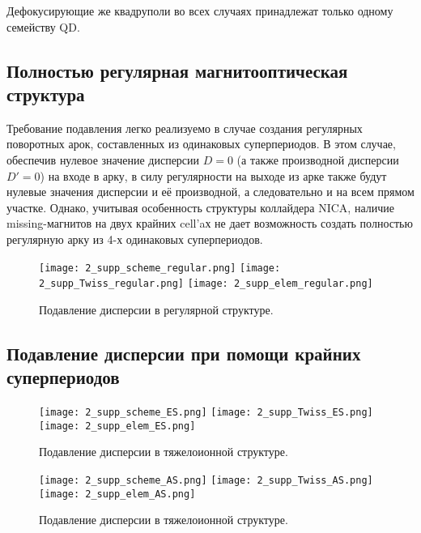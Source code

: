 \noindent Дефокусирующие же квадруполи во всех случаях принадлежат только одному семейству QD.	

\subsection{Полностью регулярная магнитооптическая структура}\label{subsec:transition_variation/disp_supperssion/regular}

\par Требование подавления легко реализуемо в случае создания регулярных поворотных арок, составленных из одинаковых суперпериодов. В этом случае, обеспечив нулевое значение дисперсии $D=0$ (а также производной дисперсии $D\prime=0$) на входе в арку, в силу регулярности на выходе из арке также будут нулевые значения дисперсии и её производной, а следовательно и на всем прямом участке. Однако, учитывая особенность структуры коллайдера NICA, наличие missing-магнитов на двух крайних cell’aх не дает возможность создать полностью регулярную арку из 4-х одинаковых суперпериодов.

\begin{figure} [h!]
   \center
   \texttt{[image: 2\_supp\_scheme\_regular.png]}
   \texttt{[image: 2\_supp\_Twiss\_regular.png]}
   \texttt{[image: 2\_supp\_elem\_regular.png]}
   \caption{Подавление дисперсии в регулярной структуре.}
   \label{fig:2_disp_supp_full_regular}
\end{figure}
	
\subsection{Подавление дисперсии при помощи крайних суперпериодов}\label{subsec:transition_variation/disp_supperssion/ES}

\par	
\begin{figure} [h!]
   \center
   \texttt{[image: 2\_supp\_scheme\_ES.png]}
   \texttt{[image: 2\_supp\_Twiss\_ES.png]}
   \texttt{[image: 2\_supp\_elem\_ES.png]}
   \caption{Подавление дисперсии в тяжелоионной структуре.}
   \label{fig:2_disp_supp_ES}
\end{figure}	

\begin{figure} [h!]
   \center
   \texttt{[image: 2\_supp\_scheme\_AS.png]}
   \texttt{[image: 2\_supp\_Twiss\_AS.png]}
   \texttt{[image: 2\_supp\_elem\_AS.png]}
   \caption{Подавление дисперсии в тяжелоионной структуре.}
   \label{fig:2_disp_supp_AS}
\end{figure}	

